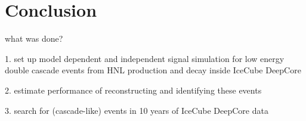 \setchapterpreamble[u]{\margintoc}

\chapter{Conclusion}




what was done?

1. set up model dependent and independent signal simulation for low energy double cascade events from HNL production and decay inside IceCube DeepCore

2. estimate performance of reconstructing and identifying these events

3. search for (cascade-like) events in 10 years of IceCube DeepCore data
